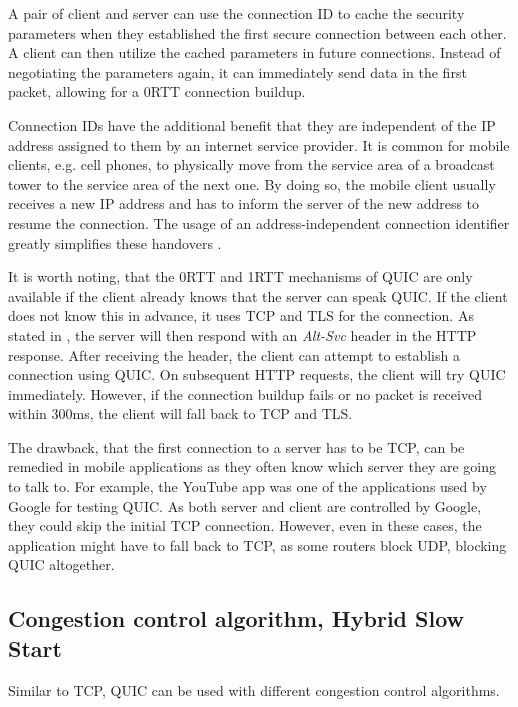 \documentclass[conference]{IEEEtran}
\begin{document}
A pair of client and server can use the connection ID to cache the security parameters when they established the first secure connection between each other. A client can then utilize the cached parameters in future connections. Instead of negotiating the parameters again, it can immediately send data in the first packet, allowing for a 0RTT connection buildup.

Connection IDs have the additional benefit that they are independent of the IP address assigned to them by an internet service provider. It is common for mobile clients, e.g. cell phones, to physically move from the service area of a broadcast tower to the service area of the next one. By doing so, the mobile client usually receives a new IP address and has to inform the server of the new address to resume the connection. The usage of an address-independent connection identifier greatly simplifies these handovers \cite{HowQuickIsQuic}.

It is worth noting, that the 0RTT and 1RTT mechanisms of QUIC are only available if the client already knows that the server can speak QUIC. If the client does not know this in advance, it uses TCP and TLS for the connection. As stated in \cite{Google}, the server will then respond with an \textit{Alt-Svc} header in the HTTP response. After receiving the header, the client can attempt to establish a connection using QUIC. On subsequent HTTP requests, the client will try QUIC immediately. However, if the connection buildup fails or no packet is received within 300ms, the client will fall back to TCP and TLS.

The drawback, that the first connection to a server has to be TCP, can be remedied in mobile applications as they often know which server they are going to talk to. For example, the YouTube app was one of the applications used by Google for testing QUIC. As both server and client are controlled by Google, they could skip the initial TCP connection. However, even in these cases, the application might have to fall back to TCP, as some routers block UDP, blocking QUIC altogether.

\subsection{Congestion control algorithm, Hybrid Slow Start}
Similar to TCP, QUIC can be used with different congestion control algorithms. 
\end{document}
